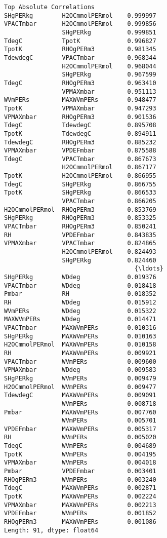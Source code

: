 \documentclass[11pt]{article}
\begin{document}
\begin{Verbatim}[commandchars=\\\{\}]
Top Absolute Correlations
SHgPERkg        H2OCmmolPERmol    0.999997
VPACTmbar       H2OCmmolPERmol    0.999856
                SHgPERkg          0.999851
TdegC           TpotK             0.996827
TpotK           RHOgPERm3         0.981345
TdewdegC        VPACTmbar         0.968344
                H2OCmmolPERmol    0.968044
                SHgPERkg          0.967599
TdegC           RHOgPERm3         0.963410
                VPMAXmbar         0.951113
WVmPERs         MAXWVmPERs        0.948477
TpotK           VPMAXmbar         0.947293
VPMAXmbar       RHOgPERm3         0.901536
TdegC           TdewdegC          0.895708
TpotK           TdewdegC          0.894911
TdewdegC        RHOgPERm3         0.885232
VPMAXmbar       VPDEFmbar         0.875588
TdegC           VPACTmbar         0.867673
                H2OCmmolPERmol    0.867177
TpotK           H2OCmmolPERmol    0.866955
TdegC           SHgPERkg          0.866755
TpotK           SHgPERkg          0.866533
                VPACTmbar         0.866205
H2OCmmolPERmol  RHOgPERm3         0.853769
SHgPERkg        RHOgPERm3         0.853325
VPACTmbar       RHOgPERm3         0.850241
RH              VPDEFmbar         0.843835
VPMAXmbar       VPACTmbar         0.824865
                H2OCmmolPERmol    0.824493
                SHgPERkg          0.824460
                                    {\ldots}   
SHgPERkg        WDdeg             0.019376
VPACTmbar       WDdeg             0.018418
Pmbar           RH                0.018352
RH              WDdeg             0.015912
WVmPERs         WDdeg             0.015322
MAXWVmPERs      WDdeg             0.014471
VPACTmbar       MAXWVmPERs        0.010316
SHgPERkg        MAXWVmPERs        0.010163
H2OCmmolPERmol  MAXWVmPERs        0.010158
RH              MAXWVmPERs        0.009921
VPACTmbar       WVmPERs           0.009600
VPMAXmbar       WDdeg             0.009583
SHgPERkg        WVmPERs           0.009479
H2OCmmolPERmol  WVmPERs           0.009477
TdewdegC        MAXWVmPERs        0.009091
                WVmPERs           0.008718
Pmbar           MAXWVmPERs        0.007760
                WVmPERs           0.005701
VPDEFmbar       MAXWVmPERs        0.005317
RH              WVmPERs           0.005020
TdegC           WVmPERs           0.004689
TpotK           WVmPERs           0.004195
VPMAXmbar       WVmPERs           0.004018
Pmbar           VPDEFmbar         0.003401
RHOgPERm3       WVmPERs           0.003240
TdegC           MAXWVmPERs        0.002871
TpotK           MAXWVmPERs        0.002224
VPMAXmbar       MAXWVmPERs        0.002213
VPDEFmbar       WVmPERs           0.001852
RHOgPERm3       MAXWVmPERs        0.001086
Length: 91, dtype: float64

    \end{Verbatim}
\end{document}
